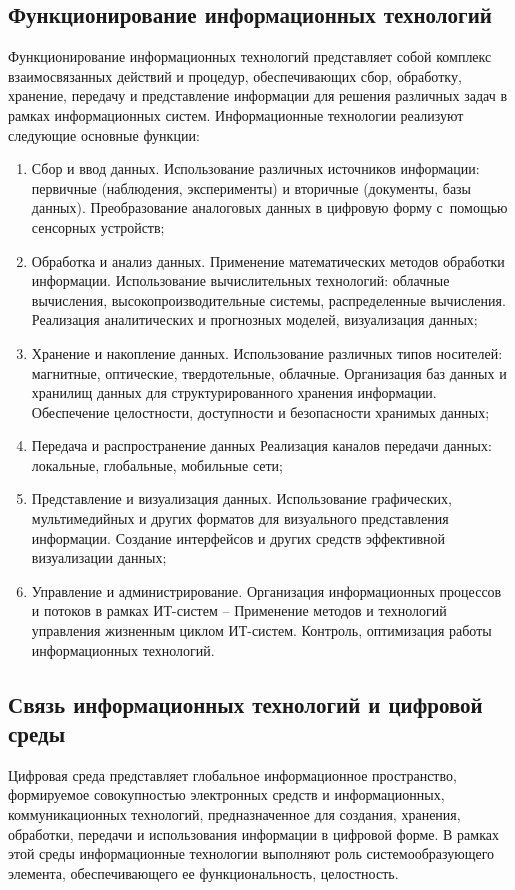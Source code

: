 \documentclass{ou}
\begin{document}
\subsection{Функционирование информационных технологий}
Функционирование информационных технологий представляет собой комплекс взаимосвязанных действий и процедур, обеспечивающих сбор, обработку, хранение, передачу и представление информации для решения различных задач в рамках информационных систем. Информационные технологии реализуют следующие основные функции:
\begin{enumerate}[leftmargin=0em, itemindent=3.75em, nosep, label=\arabic*)]
\item Сбор и ввод данных. Использование различных источников информации: первичные (наблюдения, эксперименты) и вторичные (документы, базы данных). Преобразование аналоговых данных в цифровую форму с~помощью сенсорных устройств;
\item Обработка и анализ данных. Применение математических методов обработки информации. Использование вычислительных технологий: облачные вычисления, высокопроизводительные системы, распределенные вычисления. Реализация аналитических и прогнозных моделей, визуализация данных;
\item Хранение и накопление данных. Использование различных типов носителей: магнитные, оптические, твердотельные, облачные. Организация баз данных и хранилищ данных для структурированного хранения информации. Обеспечение целостности, доступности и безопасности хранимых данных;
\item Передача и распространение данных Реализация каналов передачи данных: локальные, глобальные, мобильные сети;
\item Представление и визуализация данных. Использование графических, мультимедийных и других форматов для визуального представления информации. Создание интерфейсов и других средств эффективной визуализации данных;
\item Управление и администрирование. Организация информационных процессов и потоков в рамках ИТ-систем -- Применение методов и технологий управления жизненным циклом ИТ-систем. Контроль, оптимизация работы информационных технологий\cite{Computerra}.
\end{enumerate}
\subsection{Связь информационных технологий и цифровой среды}
Цифровая среда представляет глобальное информационное пространство, формируемое совокупностью электронных средств и информационных, коммуникационных технологий, предназначенное для создания, хранения, обработки, передачи и использования информации в цифровой форме. В рамках этой среды информационные технологии выполняют роль системообразующего элемента, обеспечивающего ее функциональность, целостность\cite{sviazexpo}.
\end{document}
